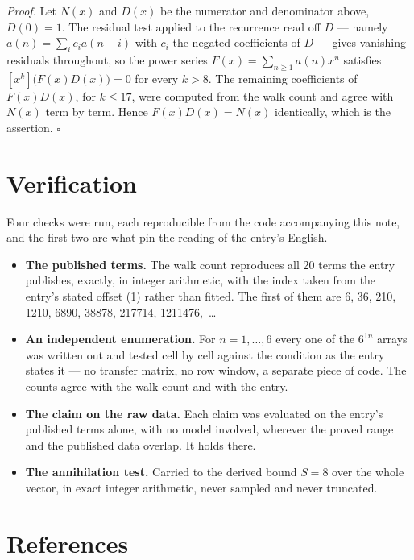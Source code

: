 \documentclass[11pt]{article}
\theoremstyle{definition}
\begin{document}
{\itshape Proof.} Let $N(x)$ and $D(x)$ be the numerator and denominator above, $D(0)=1$. The residual test applied to the recurrence read off $D$ --- namely $a(n) = \sum_i c_i a(n-i)$ with $c_i$ the negated coefficients of $D$ --- gives vanishing residuals throughout, so the power series $F(x)=\sum_{n\ge 1}a(n)x^n$ satisfies $[x^k]\bigl(F(x)D(x)\bigr) = 0$ for every $k > 8$. The remaining coefficients of $F(x)D(x)$, for $k \le 17$, were computed from the walk count and agree with $N(x)$ term by term. Hence $F(x)D(x) = N(x)$ identically, which is the assertion. $\square$

\section{Verification}

Four checks were run, each reproducible from the code accompanying this note, and the first two are what pin the reading of the entry's English.

\begin{itemize}

\item {\bfseries The published terms.} The walk count reproduces all 20 terms the entry publishes, exactly, in integer arithmetic, with the index taken from the entry's stated offset (1) rather than fitted. The first of them are 6, 36, 210, 1210, 6890, 38878, 217714, 1211476,~\dots

\item {\bfseries An independent enumeration.} For $n = 1,\dots,6$ every one of the $6^{1n}$ arrays was written out and tested cell by cell against the condition as the entry states it --- no transfer matrix, no row window, a separate piece of code. The counts agree with the walk count and with the entry.

\item {\bfseries The claim on the raw data.} Each claim was evaluated on the entry's published terms alone, with no model involved, wherever the proved range and the published data overlap. It holds there.

\item {\bfseries The annihilation test.} Carried to the derived bound $S = 8$ over the whole vector, in exact integer arithmetic, never sampled and never truncated.

\end{itemize}

\section{References}
\end{document}

